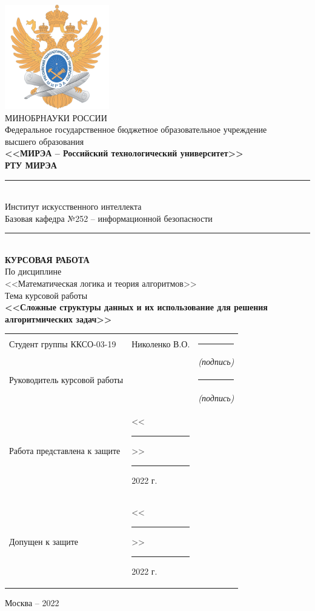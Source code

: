\documentclass[utf8,14pt,a4paper,oneside,russian]{book}
\begin{document}
	
	\thispagestyle{empty}
	\small
	\begin{center}
		\includegraphics[width=4.55cm]{logo_mirea}\\
		\MakeUppercase{Минобрнауки России}\\[1em]
		Федеральное государственное бюджетное образовательное учреждение\\
		высшего образования\\[0.5em]
		\textbf{<<МИРЭА -- Российский технологический университет>>}\\
		\textbf{РТУ МИРЭА}\\
		\rule{\textwidth}{0.75pt}\\
		Институт искусственного интеллекта\\
		Базовая кафедра №252 -- информационной безопасности\\[-0.45em]
		\rule{\textwidth}{0.75pt}\\[5em]
		\normalsize\MakeUppercase{\textbf{Курсовая работа}}\small\\[0.5em]
		По дисциплине\\ <<Математическая логика и теория алгоритмов>>\\[1.5em]
		Тема курсовой работы\\ \textbf{<<Сложные структуры данных и их использование для решения алгоритмических задач>>} \\[3em]
		\begin{tabular}{p{7cm}p{6cm}c}
			Студент группы ККСО-03-19 & Николенко В.О. & \rule{2cm}{0.75pt}\\[-0.5em]
			& & \footnotesize\textit{(подпись)}\small\\[1em]
			Руководитель курсовой работы &  & \rule{2cm}{0.75pt}\\[-0.5em]
			& & \footnotesize\textit{(подпись)}\small\\[5em]
			Работа представлена к защите & <<\rule{0.5cm}{0.75pt}>> \rule{2cm}{0.75pt} 2022 г. & \\[1em]
			Допущен к защите & <<\rule{0.5cm}{0.75pt}>> \rule{2cm}{0.75pt} 2022 г. & \\[1em]
		\end{tabular}
		\vfill
		Москва -- 2022
	\end{center}
	\normalsize
	\newpage
	
\end{document}
